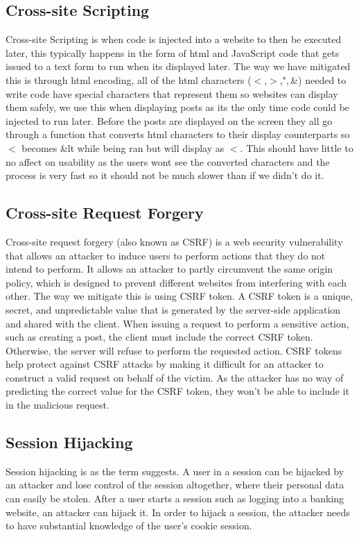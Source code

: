 \documentclass{cmpstyle}
\begin{document}
\subsection{Cross-site Scripting}
Cross-site Scripting is when code is injected into a website to then be executed later, this typically happens in the form of html and JavaScript code that gets issued to a text form to run when its displayed later. The way we have mitigated this is through html encoding, all of the html characters ($<$,$>$,",\,\&) needed to write code have special characters that represent them so websites can display them safely, we use this when displaying posts as its the only time code could be injected to run later. Before the posts are displayed on the screen they all go through a function that converts html characters to their display counterparts so $<$ becomes \&lt while being ran but will display as $<$. This should have little to no affect on usability as the users wont see the converted characters and the process is very fast so it should not be much slower than if we didn't do it.
\subsection{Cross-site Request Forgery}
Cross-site request forgery (also known as CSRF) is a web security vulnerability that allows an attacker to induce users to perform actions that they do not intend to perform. It allows an attacker to partly circumvent the same origin policy, which is designed to prevent different websites from interfering with each other. The way we mitigate this is using CSRF token. A CSRF token is a unique, secret, and unpredictable value that is generated by the server-side application and shared with the client. When issuing a request to perform a sensitive action, such as creating a post, the client must include the correct CSRF token. Otherwise, the server will refuse to perform the requested action. CSRF tokens help protect against CSRF attacks by making it difficult for an attacker to construct a valid request on behalf of the victim. As the attacker has no way of predicting the correct value for the CSRF token, they won't be able to include it in the malicious request.
\subsection{Session Hijacking}
Session hijacking is as the term suggests. A user in a session can be hijacked by an attacker and lose control of the session altogether, where their personal data can easily be stolen. After a user starts a session such as logging into a banking website, an attacker can hijack it. In order to hijack a session, the attacker needs to have substantial knowledge of the user’s cookie session.
\end{document}

